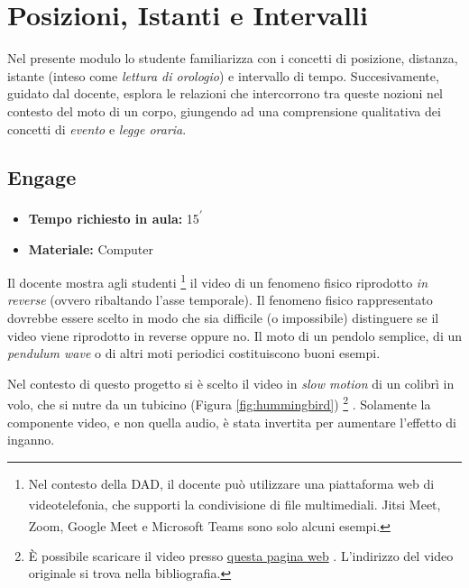 \documentclass{report} \usepackage[T1]{fontenc} \usepackage[italian]{babel}
\begin{document}
\chapter{Posizioni, Istanti e Intervalli}
Nel presente modulo lo studente familiarizza con i concetti
di posizione, distanza, istante (inteso come
\emph{lettura di orologio}) e intervallo di tempo.
Succesivamente, guidato dal docente, esplora le relazioni
che intercorrono tra queste nozioni nel contesto del moto di
un corpo, giungendo ad una comprensione qualitativa dei
concetti di \emph{evento} e \emph{legge oraria}.

\section{Engage}
\begin{itemize}
\item \textbf{Tempo richiesto in aula:} 15\textsuperscript{$\prime$}
\item \textbf{Materiale:} Computer
\end{itemize}

Il docente mostra agli studenti
\footnote{
Nel contesto della DAD, il docente può utilizzare
una piattaforma web di videotelefonia, che supporti la condivisione
di file multimediali. Jitsi Meet\textsuperscript{\textregistered},
Zoom\textsuperscript{\textregistered},
Google Meet\textsuperscript{\textregistered} e
Microsoft Teams\textsuperscript{\textregistered}
sono solo alcuni esempi.
}
il video di un fenomeno fisico riprodotto \emph{in reverse} (ovvero ribaltando
l'asse temporale). Il fenomeno fisico rappresentato dovrebbe essere scelto
in modo che sia difficile (o impossibile) distinguere se il video viene
riprodotto in reverse oppure no. Il moto di un pendolo semplice,
di un \emph{pendulum wave} o di altri moti periodici costituiscono buoni
esempi.

Nel contesto di questo progetto si è scelto il video in \emph{slow motion}
di un colibrì in volo, che si nutre da un tubicino (Figura \ref{fig:hummingbird}) 
\footnote{
\`E possibile scaricare il video presso
\href{https://github.com/savaroskij/PED1/blob/master/progetto_finale/media/video/Hummingbird.mp4?raw=true}{questa pagina web}
. L'indirizzo del video originale si trova nella bibliografia\cite{hbird}.
}
. Solamente la componente video, e non quella audio, è stata invertita per
aumentare l'effetto di inganno.
\end{document}
